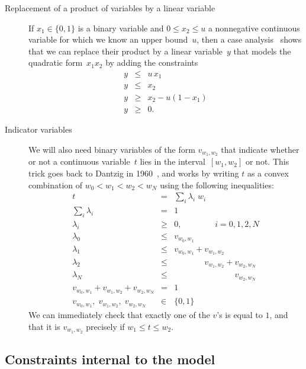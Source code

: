 \documentclass[11pt,reqno]{amsart}
\numberwithin{equation}{section}
\begin{document}
\begin{description}
\item[Replacement of a product of variables by a linear variable] If $x_1\in\{0,1\}$ is a
  binary variable and $0\le x_2\le u$ a nonnegative continuous variable for which we know
  an upper bound~$u$, then a case analysis~\cite[Chapter~7]{aimms} shows that we can
  replace their product by a linear variable~$y$ that models the quadratic form~$x_1x_2$
  by adding the constraints
  \begin{eqnarray*}
    y &\le& u\, x_1 \\
    y &\le& x_2 \\
    y &\ge& x_2 - u(1-x_1) \\
    y &\ge& 0.
  \end{eqnarray*}

\item[Indicator variables] We will also need binary variables of the form $v_{w_1,w_2}$
  that indicate whether or not a continuous variable~$t$ lies in the interval~$[w_1,w_2]$
  or not. This trick goes back to Dantzig in 1960~\cite{dantzig60}, and works by writing
  $t$ as a convex combination of $w_0<w_1<w_2<w_N$ using the following inequalities:
  \begin{eqnarray*}
    t &=& \sum_i \lambda_i\; w_i\\
    \sum_i \lambda_i &=& 1\\
    \lambda_i &\ge& 0, \qquad\qquad i=0,1,2,N\\
    \lambda_0 &\le& v_{w_0,w_1}\\
    \lambda_1 &\le& v_{w_0,w_1} + v_{w_1,w_2}\\
    \lambda_2 &\le& \phantom{v_{w_0,w_1} +{}}v_{w_1,w_2} + v_{w_2,w_N}\\
    \lambda_N &\le& \phantom{v_{w_0,w_1} + v_{w_1,w_2}+{}}v_{w_2,w_N}\\
    v_{w_0,w_1} + v_{w_1,w_2} + v_{w_2,w_N} &=& 1\\
    v_{w_0,w_1},\; v_{w_1,w_2},\; v_{w_2,w_N} &\in& \{0,1\}
  \end{eqnarray*}
  We can immediately check that exactly one of the $v$'s is equal to $1$, and that it is
  $v_{w_1,w_2}$ precisely if $w_1\le t\le w_2$.
\end{description}

\subsection{Constraints internal to the model}
\end{document}
